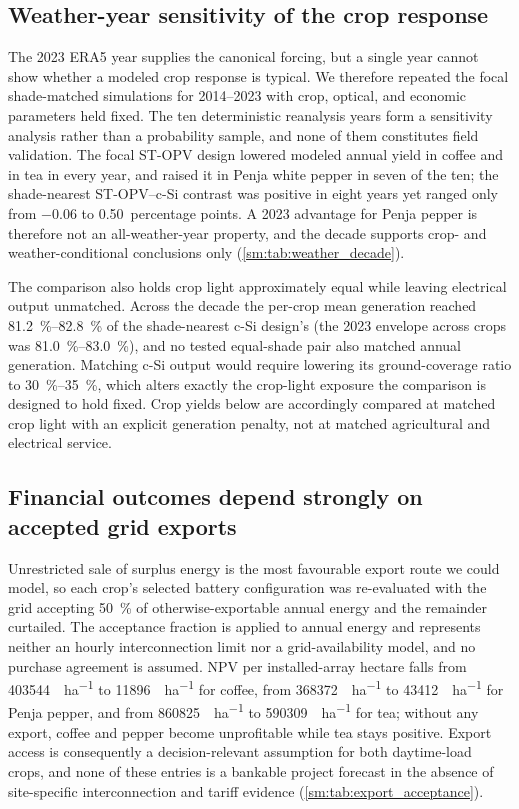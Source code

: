 \documentclass[preprint,12pt,a4paper]{elsarticle}
\begin{document}
\subsection{Weather-year sensitivity of the crop response}
\label{sec:weather_year_sensitivity}

The 2023 ERA5 year supplies the canonical forcing, but a single year cannot show whether a modeled crop response is typical. We therefore repeated the focal shade-matched simulations for 2014--2023 with crop, optical, and economic parameters held fixed. The ten deterministic reanalysis years form a sensitivity analysis rather than a probability sample, and none of them constitutes field validation. The focal ST-OPV design lowered modeled annual yield in coffee and in tea in every year, and raised it in Penja white pepper in seven of the ten; the shade-nearest ST-OPV--c-Si contrast was positive in eight years yet ranged only from \num{-0.06} to \num{+0.50}~percentage points. A 2023 advantage for Penja pepper is therefore not an all-weather-year property, and the decade supports crop- and weather-conditional conclusions only (\cref{sm:tab:weather_decade}).

The comparison also holds crop light approximately equal while leaving electrical output unmatched. Across the decade the per-crop mean generation reached \qtyrange{81.2}{82.8}{\percent} of the shade-nearest c-Si design's (the 2023 envelope across crops was \qtyrange{81.0}{83.0}{\percent}), and no tested equal-shade pair also matched annual generation. Matching c-Si output would require lowering its ground-coverage ratio to \qtyrange{30}{35}{\percent}, which alters exactly the crop-light exposure the comparison is designed to hold fixed. Crop yields below are accordingly compared at matched crop light with an explicit generation penalty, not at matched agricultural and electrical service.

\subsection{Financial outcomes depend strongly on accepted grid exports}
\label{sec:export_acceptance}

Unrestricted sale of surplus energy is the most favourable export route we could model, so each crop's selected battery configuration was re-evaluated with the grid accepting \qty{50}{\percent} of otherwise-exportable annual energy and the remainder curtailed. The acceptance fraction is applied to annual energy and represents neither an hourly interconnection limit nor a grid-availability model, and no purchase agreement is assumed. NPV per installed-array hectare falls from \qty{403544}{\USD\per\hectare} to \qty{11896}{\USD\per\hectare} for coffee, from \qty{368372}{\USD\per\hectare} to \qty{43412}{\USD\per\hectare} for Penja pepper, and from \qty{860825}{\USD\per\hectare} to \qty{590309}{\USD\per\hectare} for tea; without any export, coffee and pepper become unprofitable while tea stays positive. Export access is consequently a decision-relevant assumption for both daytime-load crops, and none of these entries is a bankable project forecast in the absence of site-specific interconnection and tariff evidence (\cref{sm:tab:export_acceptance}).
\end{document}
